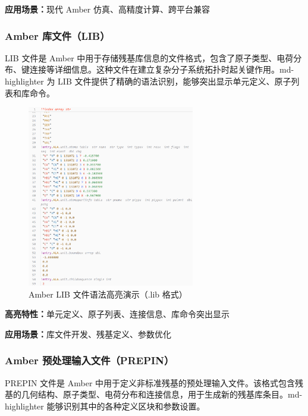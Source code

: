 \textbf{应用场景：}现代 Amber 仿真、高精度计算、跨平台兼容

\subsubsection{Amber 库文件（LIB）}

LIB 文件是 Amber 中用于存储残基库信息的文件格式，包含了原子类型、电荷分布、键连接等详细信息。这种文件在建立复杂分子系统拓扑时起关键作用。md-highlighter 为 LIB 文件提供了精确的语法识别，能够突出显示单元定义、原子列表和库命令。

\begin{figure}[!h]
    \centering
    \includegraphics[width=0.65\textwidth]{../images/lib.png}
    \caption{Amber LIB 文件语法高亮演示（.lib 格式）}
    \label{fig:lib-highlighting}
\end{figure}

\textbf{高亮特性：}单元定义、原子列表、连接信息、库命令突出显示

\textbf{应用场景：}库文件开发、残基定义、参数优化

\subsubsection{Amber 预处理输入文件（PREPIN）}

PREPIN 文件是 Amber 中用于定义非标准残基的预处理输入文件。该格式包含残基的几何结构、原子类型、电荷分布和连接信息，用于生成新的残基库条目。md-highlighter 能够识别其中的各种定义区块和参数设置。

